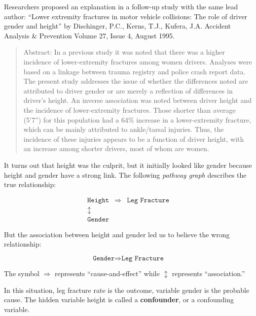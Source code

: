 \documentclass[11pt, chapterprefix=true]{scrbook}\usepackage[]{graphicx}\usepackage[]{color}
\begin{document}
Researchers proposed an explanation in a follow-up study with the same lead author: ``Lower extremity fractures in motor vehicle collisions: The role of driver gender and height'' by Dischinger, P.C., Kerns, T.J., Kufera, J.A. Accident Analysis \& Prevention Volume 27, Issue 4, August 1995.

\begin{quotation}
Abstract: In a previous study it was noted that there was a higher incidence of lower-extremity fractures among women drivers. Analyses were based on a linkage between trauma registry and police crash report data. The present study addresses the issue of whether the differences noted are attributed to driver gender or are merely a reflection of differences in driver's height. An inverse association was noted between driver height and the incidence of lower-extremity fractures. Those shorter than average (5'7'') for this population had a 64\% increase in a lower-extremity fracture, which can be mainly attributed to ankle/tarsal injuries. Thus, the incidence of these injuries appears to be a function of driver height, with an increase among shorter drivers, most of whom are women.
\end{quotation}  \citep{dischinger1995}

It turns out that height was the culprit, but it initially looked like gender because height and gender have a strong link.  The following \textit{pathway graph} describes the true relationship:

\begin{eqnarray*}
\texttt{Height} & \Rightarrow & \texttt{Leg Fracture} \\
\updownarrow &  & \\
\texttt{Gender} & &
\end{eqnarray*}

But the association between height and gender led us to believe the wrong relationship:

$$ \texttt{Gender} \Rightarrow  \texttt{Leg Fracture} $$

The symbol $\Rightarrow$ represents ``cause-and-effect'' while $\updownarrow$      represents ``association.''

In this situation, leg fracture rate is the outcome, variable gender is the probable cause.  The hidden variable height is called a \textbf{confounder}, or a confounding variable.

\end{document}
